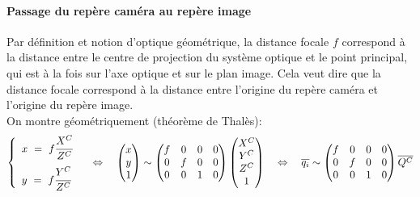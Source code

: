 \documentclass[a4paper, 11pt]{article}
\begin{document}
	\paragraph{Passage du repère caméra au repère image\\}
		Par définition et notion d'optique géométrique, la distance focale $f$ correspond à la distance entre le centre de projection du système optique et le point principal, qui est à la fois sur l'axe optique et sur le plan image. Cela veut dire que la distance focale correspond à la distance entre l'origine du repère caméra et l'origine du repère image.
		\\On montre géométriquement (théorème de Thalès):
		\begin{equation}
			\left\{ \begin{array}{l}
				x\ =\ f\cfrac{X^C}{Z^C}\vspace{.7em}\\
				y\ =\ f\cfrac{Y^C}{Z^C}
			\end{array}\right.
			\quad\Leftrightarrow\quad
			\begin{pmatrix}
				x\\y\\1
			\end{pmatrix} \sim \begin{pmatrix}
				f & 0 & 0 & 0\\
				0 & f & 0 & 0\\
				0 & 0 & 1 & 0
			\end{pmatrix}\begin{pmatrix}
				X^C\\Y^C\\Z^C\\1
			\end{pmatrix}
			\quad\Leftrightarrow\quad
			\overline{q_i} \sim \begin{pmatrix}
			f & 0 & 0 & 0\\
			0 & f & 0 & 0\\
			0 & 0 & 1 & 0
			\end{pmatrix} \overline{Q^C}
		\end{equation}
\end{document}
